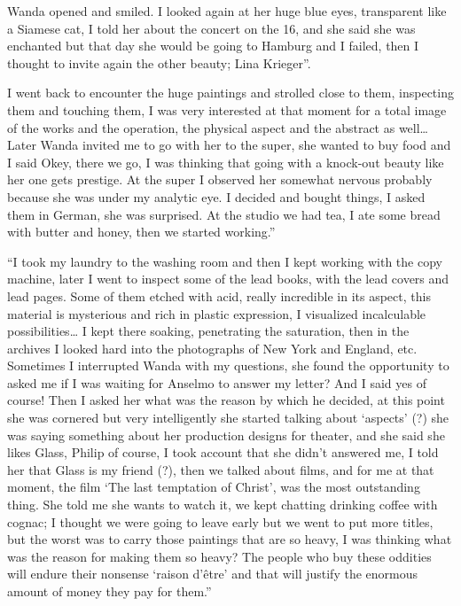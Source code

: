 \documentclass[smalldemyvopaper,11pt,twoside,onecolumn,openright,extrafontsizes]{memoir}
\begin{document}
Wanda opened and smiled. I looked again at her huge blue eyes, transparent like a Siamese cat, I told her about the concert on the 16, and she said she was enchanted but that day she would be going to Hamburg and I failed, then I thought to invite again the other beauty; Lina Krieger”.

I went back to encounter the huge paintings and strolled close to them, inspecting them and touching them, I was very interested at that moment for a total image of the works and the operation, the physical aspect and the abstract as well… Later Wanda invited me to go with her to the super, she wanted to buy food and I said Okey, there we go, I was thinking that going with a knock-out beauty like her one gets prestige. At the super I observed her somewhat nervous probably because she was under my analytic eye. I decided and bought things, I asked them in German, she was surprised. At the studio we had tea, I ate some bread with butter and honey, then we started working.”

“I took my laundry to the washing room and then I kept working with the copy machine, later I went to inspect some of the lead books, with the lead covers and lead pages. Some of them etched with acid, really incredible in its aspect, this material is mysterious and rich in plastic expression, I visualized incalculable possibilities… I kept there soaking, penetrating the saturation, then in the archives I looked hard into the photographs of New York and England, etc. Sometimes I interrupted Wanda with my questions, she found the opportunity to asked me if I was waiting for Anselmo to answer my letter? And I said yes of course! Then I asked her what was the reason by which he decided, at this point she was cornered but very intelligently she started talking about ‘aspects’ (?) she was saying something about her production designs for theater, and she said she likes Glass, Philip of course, I took account that she didn’t answered me, I told her that Glass is my friend (?), then we talked about films, and for me at that moment, the film ‘The last temptation of Christ’, was the most outstanding thing. She told me she wants to watch it, we kept chatting drinking coffee with cognac; I thought we were going to leave early but we went to put more titles, but the worst was to carry those paintings that are so heavy, I was thinking what was the reason for making them so heavy? The people who buy these oddities will endure their nonsense ‘raison d’être’ and that will justify the enormous amount of money they pay for them.”
\end{document}
